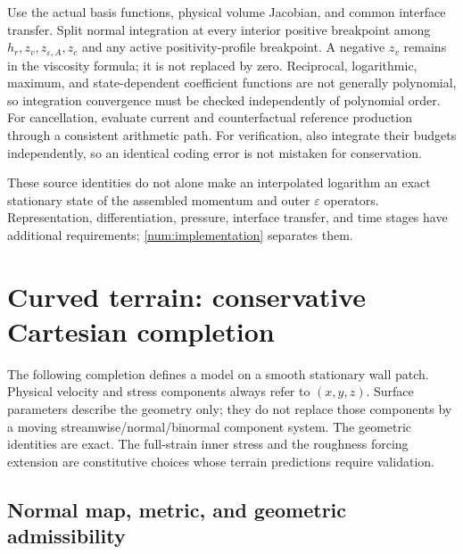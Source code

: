 \documentclass[11pt,a4paper]{article}
\numberwithin{equation}{section}
\newcommand{\eps}{\varepsilon}
\begin{document}
Use the actual basis functions, physical volume Jacobian, and
common interface transfer.  Split normal integration at every
interior positive breakpoint among $h_r,z_v,z_{\eps,A},z_c$ and
any active positivity-profile breakpoint.  A negative $z_v$ remains
in the viscosity formula; it is not replaced by zero.  Reciprocal,
logarithmic, maximum, and state-dependent coefficient functions are
not generally polynomial, so integration convergence must be
checked independently of polynomial order.  For cancellation,
evaluate current and counterfactual reference production through a
consistent arithmetic path.  For verification, also integrate their
budgets independently, so an identical coding error is not mistaken
for conservation.

These source identities do not alone make an interpolated logarithm
an exact stationary state of the assembled momentum and outer
$\eps$ operators.  Representation, differentiation, pressure,
interface transfer, and time stages have additional requirements;
\cref{num:implementation} separates them.

\section{Curved terrain: conservative Cartesian completion}
\label{geo:curved}

The following completion defines a model on a smooth stationary
wall patch.  Physical velocity and stress components always refer
to $(x,y,z)$.  Surface parameters describe the geometry only; they
do not replace those components by a moving streamwise/normal/binormal
component system.  The geometric identities are exact.  The
full-strain inner stress and the roughness forcing extension are
constitutive choices whose terrain predictions require validation.

\subsection{Normal map, metric, and geometric admissibility}
\end{document}
